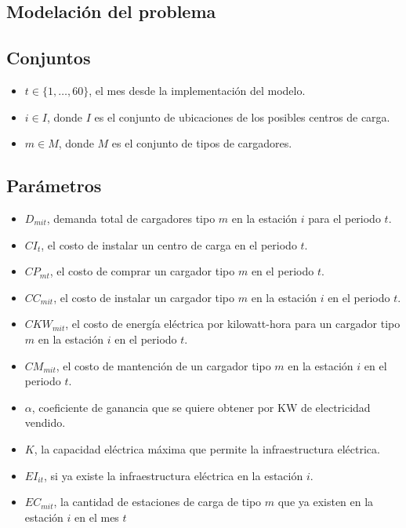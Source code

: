 \documentclass[letterpaper]{article}
\begin{document}
\begin{flushleft}
		\section{Modelación del problema}
		\subsection{Conjuntos}
		\begin{itemize}
			\item $t \in \{1, \ldots, 60\}$, el mes desde la implementación del modelo.
			\item $i \in I$, donde $I$ es el conjunto de ubicaciones de los posibles centros de carga.
			\item $m \in M$, donde $M$ es el conjunto de tipos de cargadores.
		\end{itemize}
		
		\subsection{Parámetros}
		\begin{itemize}
			\item $D_{mit}$, demanda total de cargadores tipo $m$ en la estación $i$ para el periodo $t$.
			\item $CI_{t}$, el costo de instalar un centro de carga en el periodo $t$.
			\item $CP_{mt}$, el costo de comprar un cargador tipo $m$ en el periodo $t$.
			\item $CC_{mit}$, el costo de instalar un cargador tipo $m$ en la estación $i$ en el periodo $t$.
			\item $CKW_{mit}$, el costo de energía eléctrica por kilowatt-hora para un cargador tipo $m$ en la estación $i$ en el periodo $t$.
			\item $CM_{mit}$, el costo de mantención de un cargador tipo $m$ en la estación $i$ en el periodo $t$.
			\item $\alpha$, coeficiente de ganancia que se quiere obtener por KW de electricidad vendido.
			\item $K$, la capacidad eléctrica máxima que permite la infraestructura eléctrica.
			\item $EI_{it}$, si ya existe la infraestructura eléctrica en la estación $i$.
			\item $EC_{mit}$, la cantidad de estaciones de carga de tipo $m$ que ya existen en la estación $i$ en el mes $t$
		\end{itemize}

\end{flushleft}
\end{document}
